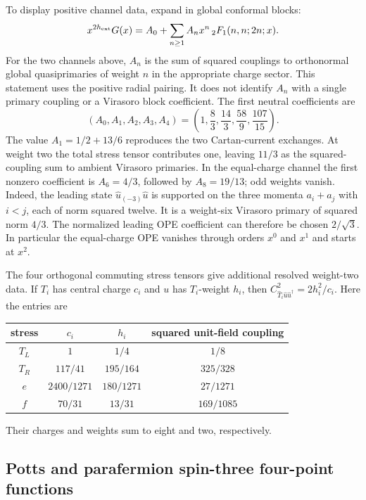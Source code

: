 To display positive channel data, expand in global conformal blocks:
\begin{equation}
 x^{2h_{\rm ext}}G(x)=A_0+
       \sum_{n\ge1}A_n x^n\,{}_2F_1(n,n;2n;x).
 \label{eq:physics-global-block-convention}
\end{equation}
For the two channels above, $A_n$ is the sum of squared couplings to
orthonormal global quasiprimaries of weight $n$ in the appropriate charge
sector.  This statement uses the positive radial pairing.  It does not
identify $A_n$ with a single primary coupling or a Virasoro block
coefficient.  The first neutral coefficients are
\begin{equation}
 (A_0,A_1,A_2,A_3,A_4)
 =\left(1,\frac83,\frac{14}3,\frac{58}9,\frac{107}{15}\right).
\end{equation}
The value $A_1=1/2+13/6$ reproduces the two Cartan-current exchanges.
At weight two the total stress tensor contributes one, leaving
$11/3$ as the squared-coupling sum to ambient Virasoro primaries.
In the equal-charge channel the first nonzero coefficient is
$A_6=4/3$, followed by $A_8=19/13$; odd weights vanish.  Indeed,
the leading state $\widehat u_{(-3)}\widehat u$ is supported on the
three momenta $a_i+a_j$ with $i<j$, each of norm squared twelve.
It is a weight-six Virasoro primary of squared norm $4/3$.
The normalized leading OPE coefficient can therefore be chosen
$2/\sqrt3$.  In particular the equal-charge OPE vanishes through
orders $x^0$ and $x^1$ and starts at $x^2$.

The four orthogonal commuting stress tensors give additional resolved
weight-two data.  If $T_i$ has central charge $c_i$ and $u$ has
$T_i$-weight $h_i$, then
$C_{\widehat T_i\widehat u\widehat u^\dagger}^2=2h_i^2/c_i$.
Here the entries are
\begin{center}
\begin{tabular}{c|c|c|c}
stress & $c_i$ & $h_i$ & squared unit-field coupling\\\hline
$T_L$ & $1$ & $1/4$ & $1/8$\\
$T_R$ & $117/41$ & $195/164$ & $325/328$\\
$e$ & $2400/1271$ & $180/1271$ & $27/1271$\\
$f$ & $70/31$ & $13/31$ & $169/1085$
\end{tabular}
\end{center}
Their charges and weights sum to eight and two, respectively.

\subsection{Potts and parafermion spin-three four-point functions}

